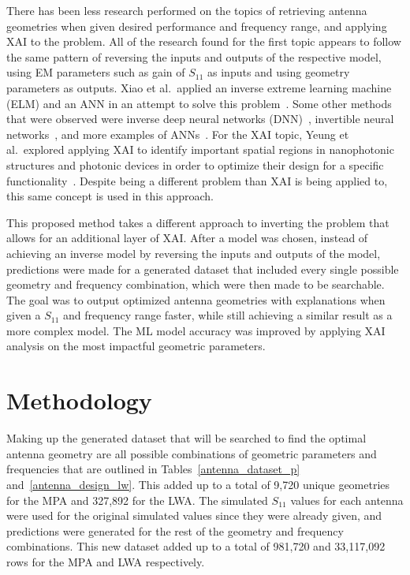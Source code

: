 \documentclass[conference]{IEEEtran}
\begin{document}
There has been less research performed on the topics of retrieving antenna geometries when given desired performance and frequency range, and applying XAI to the problem. All of the research found for the first topic appears to follow the same pattern of reversing the inputs and outputs of the respective model, using EM parameters such as gain of $S_{11}$ as inputs and using geometry parameters as outputs. Xiao et al.~applied an inverse extreme learning machine (ELM) and an ANN in an attempt to solve this problem~\cite{9063448,XiaoLi-Ye2021IANN}. Some other methods that were observed were inverse deep neural networks (DNN)~\cite{wu_ai_2024,zhang_inverse_2023}, invertible neural networks~\cite{yu_design_2020}, and more examples of ANNs~\cite{yuan_multibranch_2020}. For the XAI topic, Yeung et al.~explored applying XAI to identify important spatial regions in nanophotonic structures and photonic devices in order to optimize their design for a specific functionality~\cite{YeungChristopher2020EtBo,YeungChristopher2022EAOP}. Despite being a different problem than XAI is being applied to, this same concept is used in this approach. 

This proposed method takes a different approach to inverting the problem that allows for an additional layer of XAI. After a model was chosen, instead of achieving an inverse model by reversing the inputs and outputs of the model, predictions were made for a generated dataset that included every single possible geometry and frequency combination, which were then made to be searchable. The goal was to output optimized antenna geometries with explanations when given a $S_{11}$ and frequency range faster, while still achieving a similar result as a more complex model. The ML model accuracy was improved by applying XAI analysis on the most impactful geometric parameters. 


\section{Methodology}
Making up the generated dataset that will be searched to find the optimal antenna geometry are all possible combinations of geometric parameters and frequencies that are outlined in Tables~\ref{antenna_dataset_p} and~\ref{antenna_design_lw}. This added up to a total of 9,720 unique geometries for the MPA and 327,892 for the LWA. The simulated $S_{11}$ values for each antenna were used for the original simulated values since they were already given, and predictions were generated for the rest of the geometry and frequency combinations. This new dataset added up to a total of 981,720 and 33,117,092 rows for the MPA and LWA respectively.
\end{document}
